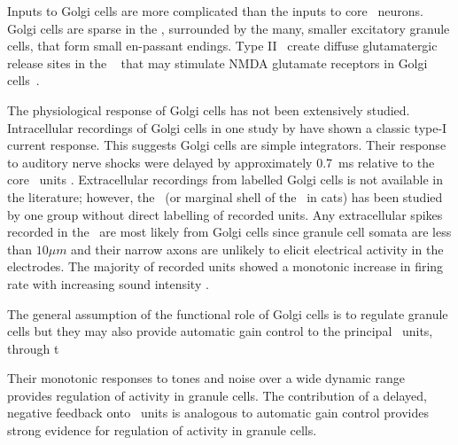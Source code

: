 


Inputs to Golgi cells are more complicated than the inputs to core
\VCN~neurons. Golgi cells are sparse in the \GCD, surrounded by the many,
smaller excitatory granule cells, that form small en-passant endings. Type II
\ANFs~create diffuse glutamatergic release sites in the
\GCD~\citep{HurdHutsonEtAl:1999,BensonBrown:2004} that may stimulate NMDA
glutamate receptors in Golgi cells~\citep{FerragamoGoldingEtAl:1998a}.


The physiological response of Golgi cells has not been extensively
studied. Intracellular recordings of Golgi cells in one study by
\citet{FerragamoGoldingEtAl:1998} have shown a classic type-I current
response. This suggests Golgi cells are simple integrators. Their response to
auditory nerve shocks were delayed by approximately 0.7~ms relative to the core
\VCN~units \citep{FerragamoGoldingEtAl:1998}. Extracellular recordings from
labelled Golgi cells is not available in the literature; however, the \GCD~(or
marginal shell of the \VCN~in cats) has been studied by one group
\citet{GhoshalKim:1997} without direct labelling of recorded units. Any
extracellular spikes recorded in the \GCD~are most likely from Golgi cells since
granule cell somata are less than $10 \mu{m}$ and their narrow axons are
unlikely to elicit electrical activity in the electrodes. The majority of
recorded units showed a monotonic increase in firing rate with increasing sound
intensity \citep[Figure~\ref{fig:GolgiKimFig2}][]{GhoshalKim:1997}.

The general assumption of the functional role of Golgi cells is to regulate
granule cells but they may also provide automatic gain control to the principal
\VCN~units, through t 

Their monotonic responses to tones and noise over a wide
dynamic range provides regulation of activity in granule cells.  The
contribution of a delayed, negative feedback onto \VCN~units is analogous to
automatic gain control provides strong evidence for regulation of activity in
granule cells.

